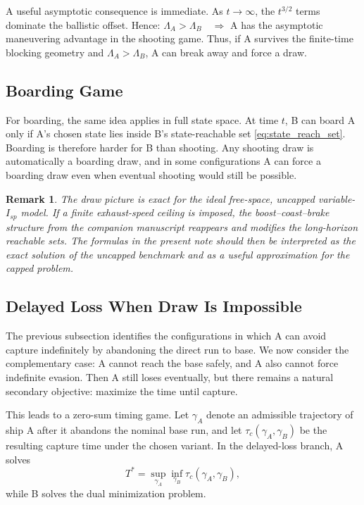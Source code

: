 \documentclass[journal, a4paper]{IEEEtran}
\newtheorem{remark}{Remark}
\begin{document}
A useful asymptotic consequence is immediate. As $t\to\infty$, the $t^{3/2}$ terms dominate the ballistic offset. Hence:
$
\Lambda_A > \Lambda_B
\quad \Longrightarrow 
$ A has the asymptotic maneuvering advantage in the shooting game.
Thus, if A survives the finite-time blocking geometry and $\Lambda_A>\Lambda_B$, A can break away and force a draw.

\subsection{Boarding Game}
For boarding, the same idea applies in full state space. At time $t$, B can board A only if A's chosen state lies inside B's state-reachable set \eqref{eq:state_reach_set}. Boarding is therefore harder for B than shooting. Any shooting draw is automatically a boarding draw, and in some configurations A can force a boarding draw even when eventual shooting would still be possible.

\begin{remark}
The draw picture is exact for the ideal free-space, uncapped variable-$I_{\!sp}$ model. If a finite exhaust-speed ceiling is imposed, the boost--coast--brake structure from the companion manuscript reappears and modifies the long-horizon reachable sets. The formulas in the present note should then be interpreted as the exact solution of the uncapped benchmark and as a useful approximation for the capped problem.
\end{remark}

\subsection{Delayed Loss When Draw Is Impossible}
The previous subsection identifies the configurations in which A can avoid capture indefinitely by abandoning the direct run to base. We now consider the complementary case: A cannot reach the base safely, and A also cannot force indefinite evasion. Then A still loses eventually, but there remains a natural secondary objective: maximize the time until capture.

This leads to a zero-sum timing game. Let $\gamma_A$ denote an admissible trajectory of ship A after it abandons the nominal base run, and let $\tau_c(\gamma_A,\gamma_B)$ be the resulting capture time under the chosen variant. In the delayed-loss branch, A solves
\begin{equation}
T^* = \sup_{\gamma_A}\inf_{\gamma_B}\tau_c(\gamma_A,\gamma_B),
\label{eq:delay_value}
\end{equation}
while B solves the dual minimization problem.
\end{document}
